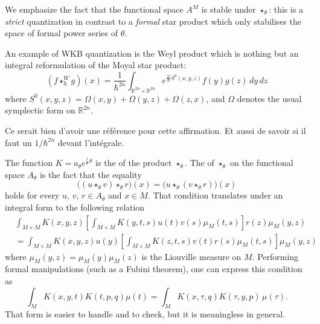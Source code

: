 We emphasize the fact that the functional space $A^M$ is stable under $\star_{\theta}$: this is a \emph{strict} quantization in contrast to a \emph{formal} star product which only stabilises the space of formal power series of $\theta$.

An example of WKB quantization is the Weyl product which is nothing but an integral reformulation of the Moyal star product:
\[ 
  (f\star^W_{\hbar}g)(x)=\frac{1}{ \hbar^{2n} }\int_{\mathbb{R}^{2n}\times\mathbb{R}^{2n}}  e^{\frac{ 2i }{ \hbar }S^0(x,y,z)}f(y)g(z)\,dy\,dz
\]
where $S^0(x,y,z)=\Omega(x,y)+\Omega(y,z)+\Omega(z,x)$, and $\Omega$ denotes the usual symplectic form on $\mathbb{R}^{2n}$.

\begin{probleme}
Ce serait bien d'avoir une référence pour cette affirmation. Et aussi de savoir si il faut un $1/\hbar^{2n}$ devant l'intégrale.
\label{ProbWeylMoy}
\end{probleme}

The function $K=a_{\theta} e^{\frac{ i }{ \theta }S}$ is the  of the product $\star_{\theta}$. The  of $\star_{\theta}$ on the functional space $A_{\theta}$ is the fact that the equality
\[ 
  \big( (u\star_{\theta}v)\star_{\theta}r \big)(x)=\big( u\star_{\theta}(v\star_{\theta}r) \big)(x)
\]
holds for every $u$, $v$, $r\in A_{\theta}$ and $x\in M$.  That condition translates under an integral form to the following relation
\begin{equation}\label{EqCondAssoc}
\begin{split}
&\int_{M\times M}K(x,y,z)\left[ \int_{M\times M}K(y,t,s)u(t)v(s)\mu_M(t,s) \right] r(z)\mu_M(y,z)\\
&=\int_{M\times M}K(x,y,z)u(y)\left[ \int_{M\times M}K(z,t,s)v(t)r(s)\mu_M(t,s) \right]\mu_M(y,z)
\end{split}
\end{equation}
where $\mu_M(y,z)=\mu_M(y)\mu_M(z)$ is the Liouville measure on $M$. Performing formal manipulations (such as a Fubini theorem), one can express this condition as
\begin{equation}        \label{EqAssosssens}
\int_{M}K(x,y,t)K(t,p,q)\mu(t)=\int_{M}K(x,\tau,q)K(\tau,y,p)\,\mu(\tau).
\end{equation}
That form is easier to handle and to check, but it is meaningless in general.

